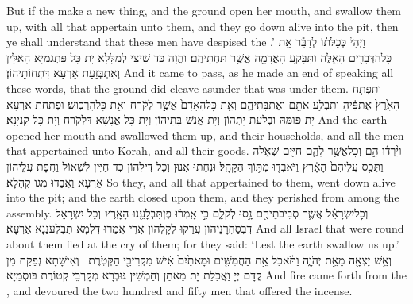 {But if the \lord\space make a new thing, and the ground open her mouth, and swallow them up, with all that appertain unto them, and they go down alive into the pit, then ye shall understand that these men have despised the \lord.’}{}
{וַיְהִי֙ כְּכַלֹּת֔וֹ לְדַבֵּ֕ר אֵ֥ת כׇּל\maqqaf הַדְּבָרִ֖ים הָאֵ֑לֶּה וַתִּבָּקַ֥ע הָאֲדָמָ֖ה אֲשֶׁ֥ר תַּחְתֵּיהֶֽם׃}
{וַהֲוָה כַּד שֵׁיצִי לְמַלָּלָא יָת כָּל פִּתְגָמַיָּא הָאִלֵּין וְאִתְבְּזַעַת אַרְעָא דִּתְחוֹתֵיהוֹן׃}
{And it came to pass, as he made an end of speaking all these words, that the ground did cleave asunder that was under them.}{}
{וַתִּפְתַּ֤ח הָאָ֙רֶץ֙ אֶת\maqqaf פִּ֔יהָ וַתִּבְלַ֥ע אֹתָ֖ם וְאֶת\maqqaf בָּתֵּיהֶ֑ם וְאֵ֤ת כׇּל\maqqaf הָאָדָם֙ אֲשֶׁ֣ר לְקֹ֔רַח וְאֵ֖ת כׇּל\maqqaf הָרְכֽוּשׁ׃}
{וּפְתַחַת אַרְעָא יָת פּוּמַּהּ וּבְלַעַת יָתְהוֹן וְיָת אֱנָשׁ בָּתֵּיהוֹן וְיָת כָּל אֲנָשָׁא דִּלְקֹרַח וְיָת כָּל קִנְיָנָא׃}
{And the earth opened her mouth and swallowed them up, and their households, and all the men that appertained unto Korah, and all their goods.}{}
{וַיֵּ֨רְד֜וּ הֵ֣ם וְכׇל\maqqaf אֲשֶׁ֥ר לָהֶ֛ם חַיִּ֖ים שְׁאֹ֑לָה וַתְּכַ֤ס עֲלֵיהֶם֙ הָאָ֔רֶץ וַיֹּאבְד֖וּ מִתּ֥וֹךְ הַקָּהָֽל׃}
{וּנְחַתוּ אִנּוּן וְכָל דִּילְהוֹן כִּד חַיִּין לִשְׁאוֹל וַחֲפָת עֲלֵיהוֹן אַרְעָא וַאֲבַדוּ מִגּוֹ קְהָלָא׃}
{So they, and all that appertained to them, went down alive into the pit; and the earth closed upon them, and they perished from among the assembly.}{}
{וְכׇל\maqqaf יִשְׂרָאֵ֗ל אֲשֶׁ֛ר סְבִיבֹתֵיהֶ֖ם נָ֣סוּ לְקֹלָ֑ם כִּ֣י אָֽמְר֔וּ פֶּן\maqqaf תִּבְלָעֵ֖נוּ הָאָֽרֶץ׃}
{וְכָל יִשְׂרָאֵל דִּבְסַחְרָנֵיהוֹן עֲרַקוּ לְקָלְהוֹן אֲרֵי אֲמַרוּ דִּלְמָא תִבְלְעִנַּנָא אַרְעָא׃}
{And all Israel that were round about them fled at the cry of them; for they said: ‘Lest the earth swallow us up.’}{}
{וְאֵ֥שׁ יָצְאָ֖ה מֵאֵ֣ת יְהֹוָ֑ה וַתֹּ֗אכַל אֵ֣ת הַחֲמִשִּׁ֤ים וּמָאתַ֙יִם֙ אִ֔ישׁ מַקְרִיבֵ֖י הַקְּטֹֽרֶת׃ \setuma }
{וְאִישָׁתָא נְפַקַת מִן קֳדָם יְיָ וַאֲכַלַת יָת מָאתַן וְחַמְשִׁין גּוּבְרָא מְקָרְבֵי קְטוֹרֶת בּוּסְמַיָּא׃}
{And fire came forth from the \lord, and devoured the two hundred and fifty men that offered the incense.}{}

